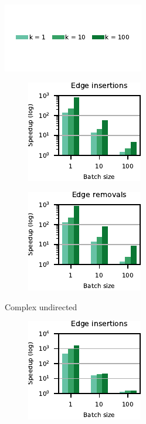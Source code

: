 \begin{figure}[tb]
\centering
\begin{subfigure}[t]{\textwidth}
\centering
\includegraphics{./sources/plots/dyn-topk/legend-speedup.pdf}
\end{subfigure}\vspace{-20pt}
%
%
\begin{subfigure}[t]{.5\textwidth}
\begin{subfigure}[t]{.5\textwidth}
\centering
\includegraphics{./sources/plots/dyn-topk/speedup-undirected-small-diameter-addition.pdf}
\end{subfigure}\hfill
\begin{subfigure}[t]{.5\textwidth}
\centering
\includegraphics{./sources/plots/dyn-topk/speedup-undirected-small-diameter-removal.pdf}
\end{subfigure}\hfill
\caption{Complex undirected}
\label{fig:dyn-topk-speedup-cmplx-undir}
\end{subfigure}\hfill
%
%
\begin{subfigure}[t]{.5\textwidth}
\begin{subfigure}[t]{.5\textwidth}
\centering
\includegraphics{./sources/plots/dyn-topk/speedup-directed-small-diameter-addition.pdf}

\end{subfigure}
\end{subfigure}
\end{figure}
